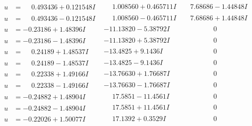\documentclass[1p]{elsarticle_modified}
\theoremstyle{definition}
\begin{document}
$$\begin{array}{c|c|c}
\begin{aligned}
u &= \phantom{-}0.493436 + 0.121548 I\end{aligned}
 & \phantom{-}1.008560 + 0.465711 I & \phantom{-}7.68686 - 1.44848 I \\ \hline\begin{aligned}
u &= \phantom{-}0.493436 - 0.121548 I\end{aligned}
 & \phantom{-}1.008560 - 0.465711 I & \phantom{-}7.68686 + 1.44848 I \\ \hline\begin{aligned}
u &= -0.23186 + 1.48396 I\end{aligned}
 & -11.13820 - 5.38792 I & \phantom{-0.000000 } 0 \\ \hline\begin{aligned}
u &= -0.23186 - 1.48396 I\end{aligned}
 & -11.13820 + 5.38792 I & \phantom{-0.000000 } 0 \\ \hline\begin{aligned}
u &= \phantom{-}0.24189 + 1.48537 I\end{aligned}
 & -13.4825 + 9.1436 I & \phantom{-0.000000 } 0 \\ \hline\begin{aligned}
u &= \phantom{-}0.24189 - 1.48537 I\end{aligned}
 & -13.4825 - 9.1436 I & \phantom{-0.000000 } 0 \\ \hline\begin{aligned}
u &= \phantom{-}0.22338 + 1.49166 I\end{aligned}
 & -13.76630 + 1.76687 I & \phantom{-0.000000 } 0 \\ \hline\begin{aligned}
u &= \phantom{-}0.22338 - 1.49166 I\end{aligned}
 & -13.76630 - 1.76687 I & \phantom{-0.000000 } 0 \\ \hline\begin{aligned}
u &= -0.24882 + 1.48904 I\end{aligned}
 & \phantom{-}17.5851 - 11.4561 I & \phantom{-0.000000 } 0 \\ \hline\begin{aligned}
u &= -0.24882 - 1.48904 I\end{aligned}
 & \phantom{-}17.5851 + 11.4561 I & \phantom{-0.000000 } 0 \\ \hline\begin{aligned}
u &= -0.22026 + 1.50077 I\end{aligned}
 & \phantom{-}17.1392 + 0.3529 I & \phantom{-0.000000 } 0 \\ \hline\begin{aligned}

\end{aligned}
\end{array}$$
\end{document}
